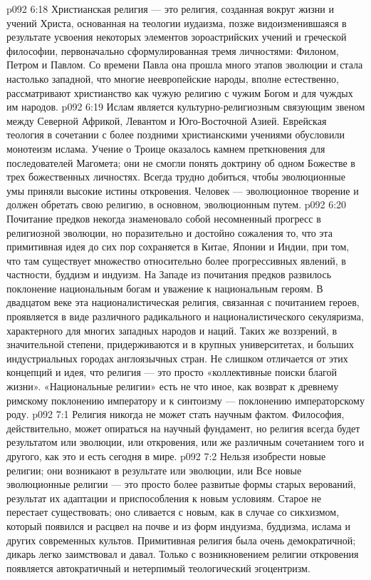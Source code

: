 \vs p092 6:18 Христианская религия --- это религия, созданная вокруг жизни и учений Христа, основанная на теологии иудаизма, позже видоизменившаяся в результате усвоения некоторых элементов зороастрийских учений и греческой философии, первоначально сформулированная тремя личностями: Филоном, Петром и Павлом. Со времени Павла она прошла много этапов эволюции и стала настолько западной, что многие неевропейские народы, вполне естественно, рассматривают христианство как чужую религию с чужим Богом и для чуждых им народов.
\vs p092 6:19 Ислам является культурно\hyp{}религиозным связующим звеном между Северной Африкой, Левантом и Юго\hyp{}Восточной Азией. Еврейская теология в сочетании с более поздними христианскими учениями обусловили монотеизм ислама. Учение о Троице оказалось камнем преткновения для последователей Магомета; они не смогли понять доктрину об одном Божестве в трех божественных личностях. Всегда трудно добиться, чтобы эволюционные умы  приняли высокие истины откровения. Человек --- эволюционное творение и должен обретать свою религию, в основном, эволюционным путем.
\vs p092 6:20 \pc Почитание предков некогда знаменовало собой несомненный прогресс в религиозной эволюции, но поразительно и достойно сожаления то, что эта примитивная идея до сих пор сохраняется в Китае, Японии и Индии, при том, что там существует множество относительно более прогрессивных явлений, в частности, буддизм и индуизм. На Западе из почитания предков развилось поклонение национальным богам и уважение к национальным героям. В двадцатом веке эта националистическая религия, связанная с почитанием героев, проявляется в виде различного радикального и националистического секуляризма, характерного для многих западных народов и наций. Таких же воззрений, в значительной степени, придерживаются и в крупных университетах, и больших индустриальных городах англоязычных стран. Не слишком отличается от этих концепций и идея, что религия --- это просто «коллективные поиски благой жизни». «Национальные религии» есть не что иное, как возврат к древнему римскому поклонению императору и к синтоизму --- поклонению императорскому роду.
\vs p092 7:1 Религия никогда не может стать научным фактом. Философия, действительно, может опираться на научный фундамент, но религия всегда будет результатом или эволюции, или откровения, или же различным сочетанием того и другого, как это и есть сегодня в мире.
\vs p092 7:2 Нельзя изобрести новые религии; они возникают в результате или эволюции, или  Все новые эволюционные религии --- это просто более развитые формы старых верований, результат их адаптации и приспособления к новым условиям. Старое не перестает существовать; оно сливается с новым, как в случае со сикхизмом, который появился и расцвел на почве и из форм индуизма, буддизма, ислама и других современных культов. Примитивная религия была очень демократичной; дикарь легко заимствовал и давал. Только с возникновением религии откровения появляется автократичный и нетерпимый теологический эгоцентризм.
